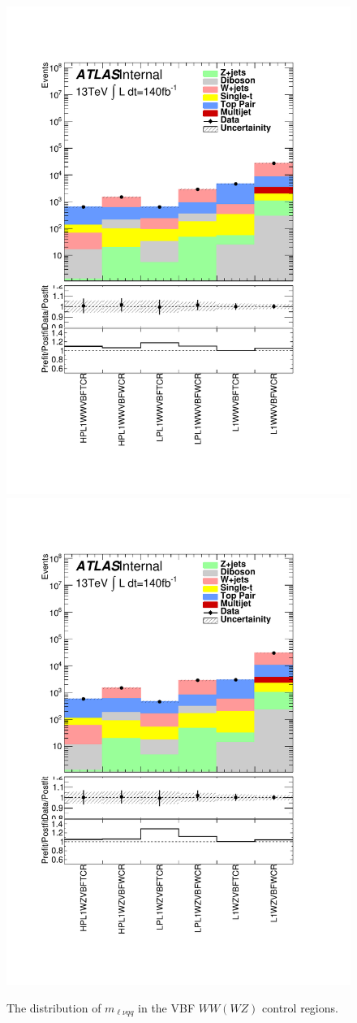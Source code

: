 \begin{figure}[h!]
  \centering
  \includegraphics[width=0.48\hsize]{figures/results/HVTWWVBF/PlotyieldTable_postfit.pdf}
    \includegraphics[width=0.48\hsize]{figures/results/HVTWZVBF/PlotyieldTable_postfit.pdf}
 \caption{The distribution of $m_{\ell\nu qq}$ in the VBF $WW(WZ)$ control regions.} 
  \label{fig:hvtwz_cr_postfit}
\end{figure} 
\FloatBarrier



